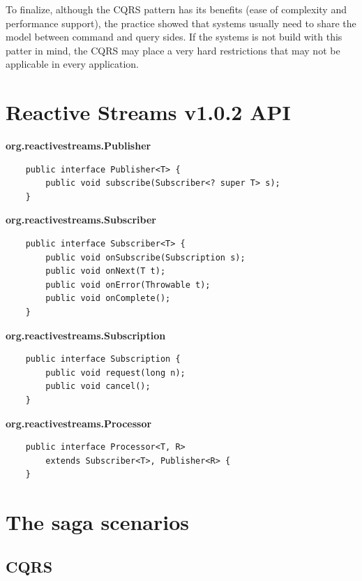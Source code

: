 \documentclass[oneside,
  digital, %
  table,   %
  nolof,     %
  nolot,     %
]{fithesis3}
\begin{document}
To finalize, although the CQRS pattern has its benefits (ease of complexity and performance support), the practice showed that systems usually need to share the model between command and query sides. If the systems is not build with this patter in mind, the CQRS may place a very hard restrictions that may not be applicable in every application.


\clearpage
\chapter{Reactive Streams v1.0.2 API}
\label{reactive_streams}

\noindent
\textbf{org.reactivestreams.Publisher}

\begin{verbatim}
    public interface Publisher<T> {
        public void subscribe(Subscriber<? super T> s);
    }
\end{verbatim}

\noindent
\textbf{org.reactivestreams.Subscriber}

\begin{verbatim}
    public interface Subscriber<T> {
        public void onSubscribe(Subscription s);
        public void onNext(T t);
        public void onError(Throwable t);
        public void onComplete();
    }
\end{verbatim}

\noindent
\textbf{org.reactivestreams.Subscription}

\begin{verbatim}
    public interface Subscription {
        public void request(long n);
        public void cancel();
    }
\end{verbatim}

\noindent
\textbf{org.reactivestreams.Processor}

\begin{verbatim}
    public interface Processor<T, R> 
        extends Subscriber<T>, Publisher<R> {
    }
\end{verbatim}


\clearpage
\chapter{The saga scenarios}
\label{sec:appendix-scenarios}

\section{CQRS}
\end{document}
